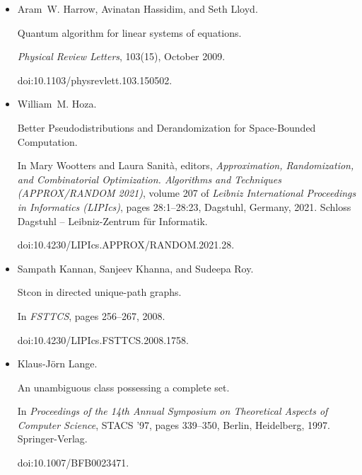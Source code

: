 \documentclass[10pt,a4paper]{article}
\begin{document}
\begin{itemize}
doi:10.4230/LIPIcs.ICALP.2021.73.





\item[] 
[15]

Aram W. Harrow, Avinatan Hassidim, and Seth Lloyd.


Quantum algorithm for linear systems of equations.


\emph{Physical Review Letters}, 103(15), October 2009.


doi:10.1103/physrevlett.103.150502.





\item[] 
[16]

William M. Hoza.


Better Pseudodistributions and Derandomization for Space-Bounded
Computation.


In Mary Wootters and Laura Sanità, editors, \emph{Approximation,
Randomization, and Combinatorial Optimization. Algorithms and Techniques
(APPROX/RANDOM 2021)}, volume 207 of \emph{Leibniz International Proceedings
in Informatics (LIPIcs)}, pages 28:1–28:23, Dagstuhl, Germany, 2021. Schloss
Dagstuhl – Leibniz-Zentrum für Informatik.


doi:10.4230/LIPIcs.APPROX/RANDOM.2021.28.





\item[] 
[17]

Sampath Kannan, Sanjeev Khanna, and Sudeepa Roy.


Stcon in directed unique-path graphs.


In \emph{FSTTCS}, pages 256–267, 2008.


doi:10.4230/LIPIcs.FSTTCS.2008.1758.





\item[] 
[18]

Klaus-Jörn Lange.


An unambiguous class possessing a complete set.


In \emph{Proceedings of the 14th Annual Symposium on Theoretical
Aspects of Computer Science}, STACS ’97, pages 339–350, Berlin, Heidelberg,
1997. Springer-Verlag.


doi:10.1007/BFB0023471.






\end{itemize}
\end{document}
